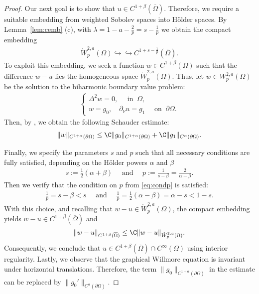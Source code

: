 \documentclass[12pt,a4paper,twoside]{article}
\begin{document}
\begin{proof}
Our next goal is to show that $u\in C^{1+\beta}(\overline{\Omega})$. Therefore, we  require a suitable embedding from weighted Sobolev spaces into Hölder spaces. By Lemma~\ref{lem:cemb} (c), with
$
    \lambda= 1-a-\frac{2}{p} = s-\frac{1}{p}
$ we obtain the compact embedding
\begin{align*}
    \mathring{W}^{2,a}_p(\Omega) \hookrightarrow\hookrightarrow C^{1+s-\frac{1}{p}}(\overline{\Omega}).
\end{align*}
To exploit this embedding, we seek a function $w\in C^{1+\beta}(\Omega)$ such that the difference  $w-u $ lies the homogeneous space $\mathring{W}^{2,a}_p(\Omega) $. 
Thus, let $w\in W^{2,a}_p(\Omega)$ be the solution to the biharmonic boundary value problem:
\begin{align*}
\begin{cases}
\Delta^2 w =0, \quad \text{ in } \ \Omega,\\
w= g_0, \quad  \partial_\nu u =  g_1 \quad \text{ on }\  \partial \Omega.
\end{cases}    
\end{align*}
Then, by \cite[Theorem 2.19, p. 45]{gazzola2010polyharmonic}, we obtain the following Schauder estimate:
\begin{align*}
\|w\|_{C^{1+\alpha}(\partial\Omega)}\le  \C\|g_0\|_{C^{1+\alpha}(\partial\Omega)} +
\C\|g_1\|_{C^{\alpha}(\partial\Omega)}.
\end{align*}

Finally, we specify the parameters $s$ and $p$ such that all necessary conditions are fully satisfied, depending on the Hölder powers $\alpha$ and $\beta$
\begin{align}
    s:= \frac{1}{2}(\alpha+\beta) \quad \text{ and } \quad p:= \frac{1}{s-\beta}=\frac 2{\alpha-\beta}. \label{eq:spparam}
\end{align}
Then we verify that the condition on $p$ from \eqref{eq:condp} is satisfied: 
\begin{align*}
    \frac{1}{p} =s -\beta < s\quad  \text{ and }
    \quad\frac{1}{p} = \frac{1}{2}(\alpha-\beta) = \alpha -s < 1-s.
\end{align*}
With this choice, and recalling that $w-u\in \mathring{W}^{2,a}_p(\Omega)  $, the compact embedding yields
 $w-u \in C^{1+\beta}(\overline{\Omega})$ and
\begin{align*}
    \|w-u\|_{C^{1+\beta}(\overline{\Omega})}\le \C\|w-u\|_{\mathring{W}^{2,a}_p(\Omega) }.
\end{align*}
Consequently, we conclude that $u\in  C^{1+\beta}(\overline{\Omega})\cap C^\infty(\Omega)$ using interior regularity. Lastly,  we observe that the graphical Willmore equation is invariant under horizontal translations. Therefore, the term $\|g_0\|_{C^{1+\alpha}(\partial\Omega)}$ in the estimate can be replaced by $\|g_0'\|_{C^{\alpha}(\partial\Omega)}$.
\end{proof} 
\end{document}
